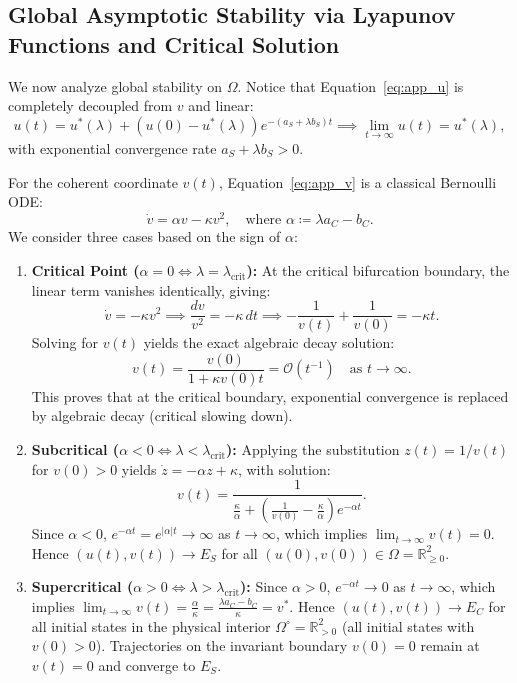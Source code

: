 \documentclass{article}
\theoremstyle{plain}
\theoremstyle{definition}
\begin{document}
\subsection{Global Asymptotic Stability via Lyapunov Functions and Critical Solution}
We now analyze global stability on $\Omega$. Notice that Equation~\eqref{eq:app_u} is completely decoupled from $v$ and linear:
\begin{equation}
    u(t) = u^*(\lambda) + \left( u(0) - u^*(\lambda) \right) e^{-(a_S + \lambda b_S) t} \implies \lim_{t \to \infty} u(t) = u^*(\lambda),
\end{equation}
with exponential convergence rate $a_S + \lambda b_S > 0$.

For the coherent coordinate $v(t)$, Equation~\eqref{eq:app_v} is a classical Bernoulli ODE:
\begin{equation}
    \dot{v} = \alpha v - \kappa v^2, \quad \text{where } \alpha \coloneqq \lambda a_C - b_C.
\end{equation}
We consider three cases based on the sign of $\alpha$:
\begin{enumerate}[leftmargin=*]
    \item \textbf{Critical Point ($\alpha = 0 \iff \lambda = \lambda_{\text{crit}}$):}
    At the critical bifurcation boundary, the linear term vanishes identically, giving:
    \begin{equation}
        \dot{v} = -\kappa v^2 \implies \frac{dv}{v^2} = -\kappa \, dt \implies -\frac{1}{v(t)} + \frac{1}{v(0)} = -\kappa t.
    \end{equation}
    Solving for $v(t)$ yields the exact algebraic decay solution:
    \begin{equation}
        v(t) = \frac{v(0)}{1 + \kappa v(0) t} = \mathcal{O}(t^{-1}) \quad \text{as } t \to \infty.
        \label{eq:critical_ode_solution}
    \end{equation}
    This proves that at the critical boundary, exponential convergence is replaced by algebraic decay (critical slowing down).
    \item \textbf{Subcritical ($\alpha < 0 \iff \lambda < \lambda_{\text{crit}}$):}
    Applying the substitution $z(t) = 1/v(t)$ for $v(0) > 0$ yields $\dot{z} = -\alpha z + \kappa$, with solution:
    \begin{equation}
        v(t) = \frac{1}{\frac{\kappa}{\alpha} + \left( \frac{1}{v(0)} - \frac{\kappa}{\alpha} \right) e^{-\alpha t}}.
    \end{equation}
    Since $\alpha < 0$, $e^{-\alpha t} = e^{|\alpha| t} \to \infty$ as $t \to \infty$, which implies $\lim_{t \to \infty} v(t) = 0$. Hence $(u(t), v(t)) \to E_S$ for all $(u(0), v(0)) \in \Omega = \mathbb{R}_{\ge 0}^2$.
    \item \textbf{Supercritical ($\alpha > 0 \iff \lambda > \lambda_{\text{crit}}$):}
    Since $\alpha > 0$, $e^{-\alpha t} \to 0$ as $t \to \infty$, which implies $\lim_{t \to \infty} v(t) = \frac{\alpha}{\kappa} = \frac{\lambda a_C - b_C}{\kappa} = v^*$. Hence $(u(t), v(t)) \to E_C$ for all initial states in the physical interior $\Omega^\circ = \mathbb{R}_{> 0}^2$ (all initial states with $v(0) > 0$). Trajectories on the invariant boundary $v(0) = 0$ remain at $v(t) = 0$ and converge to $E_S$.
\end{enumerate}
\end{document}
